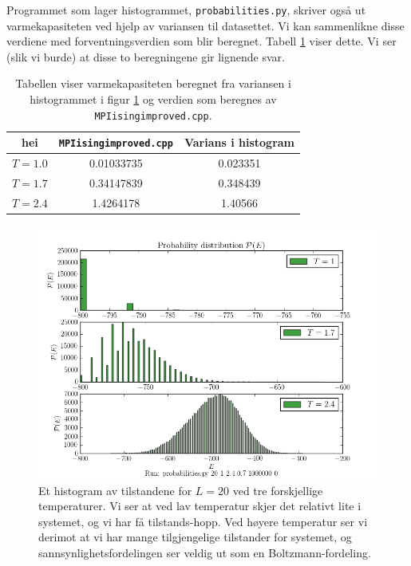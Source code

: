 \documentclass[11pt]{article}
\begin{document}
Programmet som lager histogrammet, \texttt{probabilities.py}, skriver
også ut varmekapasiteten ved hjelp av variansen til datasettet. Vi kan
sammenlikne disse verdiene med forventningsverdien som blir
beregnet. Tabell \ref{tab:var-vs-Cv} viser dette. Vi ser (slik vi
burde) at disse to beregningene gir lignende svar. 

\begin{table}
\centering
\caption{Tabellen viser varmekapasiteten beregnet fra variansen i
  histogrammet i figur \ref{fig:probabilities} og verdien som beregnes
av \texttt{MPIisingimproved.cpp}.}
\label{tab:var-vs-Cv}
\vspace{0.1cm}
\begin{tabular}{c|cc}
hei &\texttt{MPIisingimproved.cpp} & Varians i histogram\\
\hline
$T=1.0$ & 0.01033735  & 0.023351\\
$T=1.7$ & 0.34147839  & 0.348439 \\
$T=2.4$ & 1.4264178 & 1.40566
\end{tabular}
\end{table}

\begin{figure}[ht]
  \centering
  \includegraphics[scale=0.7]{../fig/prob_E.png}
  \caption{Et histogram av tilstandene for $L=20$ ved tre
forskjellige temperaturer. Vi ser at ved lav temperatur
skjer det relativt lite i systemet, og vi har få tilstands-hopp. Ved høyere temperatur ser vi derimot at vi har mange tilgjengelige tilstander for systemet, og 
sannsynlighetsfordelingen ser veldig ut som en Boltzmann-fordeling.}
\label{fig:probabilities}
\end{figure}
\end{document}
